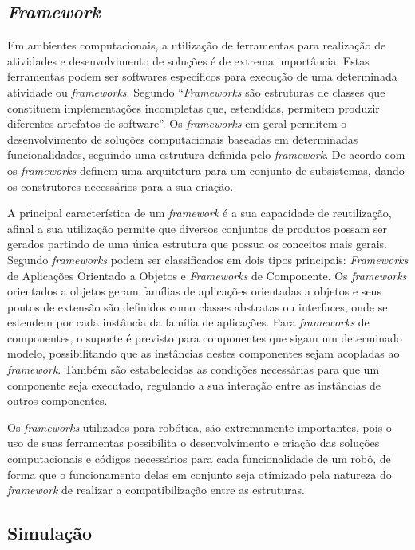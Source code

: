 \subsection{\textit{Framework}}\label{sec:framework}
Em ambientes computacionais, a utilização de ferramentas para realização de atividades e desenvolvimento de soluções é de extrema importância. Estas ferramentas podem ser softwares específicos para execução de uma determinada atividade ou \textit{frameworks}.	
Segundo \cite{maxwel_framework} “\textit{Frameworks} são estruturas de classes que constituem implementações incompletas que, estendidas, permitem produzir diferentes artefatos de software”. Os \textit{frameworks} em geral permitem o desenvolvimento de soluções computacionais baseadas em determinadas funcionalidades, seguindo uma estrutura definida pelo \textit{framework}. De acordo com \cite{maxwel_framework} os \textit{frameworks} definem uma arquitetura para um conjunto de subsistemas, dando os construtores necessários para a sua criação.

A principal característica de um \textit{framework} é a sua capacidade de reutilização, afinal a sua utilização permite que diversos conjuntos de produtos possam ser gerados partindo de uma única estrutura que possua os conceitos mais gerais.
Segundo \cite{maxwel_framework} \textit{frameworks} podem ser classificados em dois tipos principais: \textit{Frameworks} de Aplicações Orientado a Objetos e \textit{Frameworks} de Componente.
Os \textit{frameworks} orientados a objetos geram famílias de aplicações orientadas a objetos e seus pontos de extensão são definidos como classes abstratas ou interfaces, onde se estendem por cada instância da família de aplicações.
Para \textit{frameworks} de componentes, o suporte é previsto para componentes que sigam um determinado modelo, possibilitando que as instâncias destes componentes sejam acopladas ao \textit{framework}. Também são estabelecidas as condições necessárias para que um componente seja executado, regulando a sua interação entre as instâncias de outros componentes.

Os \textit{frameworks} utilizados para robótica, são extremamente importantes, pois o uso de suas ferramentas possibilita o desenvolvimento e criação das soluções computacionais e códigos necessários para cada funcionalidade de um robô, de forma que o funcionamento delas em conjunto seja otimizado pela natureza do \textit{framework} de realizar a compatibilização entre as estruturas.

\subsection{Simulação}\label{sec:simula}

